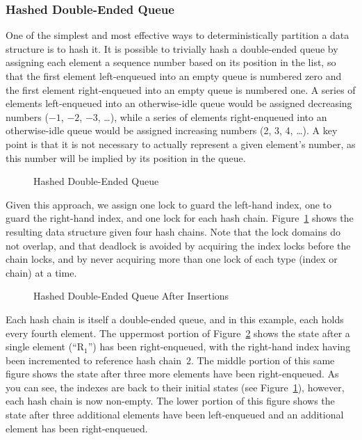 \subsubsection{Hashed Double-Ended Queue}
\label{sec:SMPdesign:Hashed Double-Ended Queue}

One of the simplest and most effective ways to deterministically
partition a data structure is to hash it.
It is possible to trivially hash a double-ended queue by assigning
each element a sequence number based on its position in the list,
so that the first element left-enqueued into an empty queue is numbered
zero and the first element right-enqueued into an empty queue is numbered
one.
A series of elements left-enqueued into an otherwise-idle queue would
be assigned decreasing numbers ($-1$, $-2$, $-3$, \ldots), while a series of
elements right-enqueued into an otherwise-idle queue would be assigned
increasing numbers (2, 3, 4, \ldots).
A key point is that it is not necessary to actually represent a given
element's number, as this number will be implied by its position in
the queue.

\begin{figure}[tb]
\centering
{}
\caption{Hashed Double-Ended Queue}
\label{fig:SMPdesign:Hashed Double-Ended Queue}
\end{figure}

Given this approach, we assign one lock to guard the left-hand index,
one to guard the right-hand index, and one lock for each hash chain.
Figure~\ref{fig:SMPdesign:Hashed Double-Ended Queue} shows the resulting
data structure given four hash chains.
Note that the lock domains do not overlap, and that deadlock is avoided
by acquiring the index locks before the chain locks, and by never
acquiring more than one lock of each type (index or chain) at a time.

\begin{figure}[tb]
\centering
{}
\caption{Hashed Double-Ended Queue After Insertions}
\label{fig:SMPdesign:Hashed Double-Ended Queue After Insertions}
\end{figure}

Each hash chain is itself a double-ended queue, and in this example,
each holds every fourth element.
The uppermost portion of
Figure~\ref{fig:SMPdesign:Hashed Double-Ended Queue After Insertions}
shows the state after a single element (``R$_1$'') has been
right-enqueued, with the right-hand index having been incremented to
reference hash chain~2.
The middle portion of this same figure shows the state after
three more elements have been right-enqueued.
As you can see, the indexes are back to their initial states
(see Figure~\ref{fig:SMPdesign:Hashed Double-Ended Queue}), however,
each hash chain is now non-empty.
The lower portion of this figure shows the state after three additional
elements have been left-enqueued and an additional element has been
right-enqueued.

